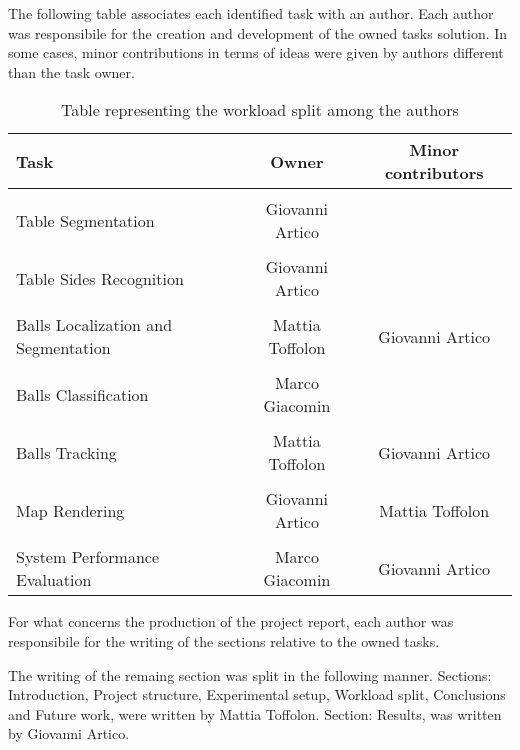 The following table associates each identified task with an author. Each author was responsibile for the creation and development of the owned tasks solution.
In some cases, minor contributions in terms of ideas were given by authors different than the task owner.
\begin{table}[h]
\centering
\begin{tabular}{|l|c|c|}
    \hline
    \textbf{Task} & \textbf{Owner} & \textbf{Minor contributors}  \\ \hline
    \\[-1em]
    Table Segmentation  & Giovanni Artico & \\ \hline
    \\[-1em]
    Table Sides Recognition &  Giovanni Artico & \\ \hline
    \\[-1em]
    Balls Localization and Segmentation & Mattia Toffolon & Giovanni Artico\\ \hline
    \\[-1em]
    Balls Classification & Marco Giacomin & \\ \hline
    \\[-1em]
    Balls Tracking & Mattia Toffolon & Giovanni Artico\\ \hline
    \\[-1em]
    Map Rendering & Giovanni Artico & Mattia Toffolon \\ \hline
    \\[-1em]
    System Performance Evaluation & Marco Giacomin & Giovanni Artico \\ \hline
\end{tabular}
\caption{Table representing the workload split among the authors}
\end{table}

\begin{flushleft}
For what concerns the production of the project report, each author was responsibile for the writing of the sections relative to the owned tasks. \\   
\end{flushleft}
The writing of the remaing section was split in the following manner.
Sections: Introduction, Project structure, Experimental setup, Workload split, Conclusions and Future work, were written by Mattia Toffolon. 
Section: Results, was written by Giovanni Artico. \\

